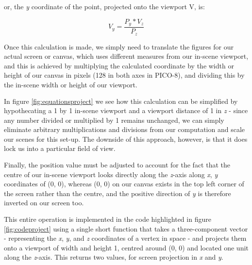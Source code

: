 \documentclass[11pt]{article}
\begin{document}
or, the \textit{y} coordinate of the point, projected onto the viewport V, is:

\begin{equation}
   V_y = \frac{P_y * V_z} {P_z}
\end{equation}

Once this calculation is made, we simply need to translate the figures for our actual screen or canvas, which uses different
measures from our in-scene viewport, and this is achieved by multiplying the calculated coordinate by the width or height of
our canvas in pixels (128 in both axes in PICO-8), and dividing this by the in-scene width or height of our viewport.

In figure \ref{fig:equationsproject} we see how this calculation can be simplified by hypothecating a 1 by 1 in-scene viewport and
a viewport distance of 1 in \textit{z} - since any number divided or multiplied by 1 remains unchanged, we can simply eliminate
arbitrary multiplications and divisions from our computation and scale our scenes for this set-up. The downside of this approach,
however, is that it does lock us into a particular field of view.

Finally, the position value must be adjusted to account for the fact that the centre of our in-scene viewport looks directly
along the \textit{z}-axis along \textit{x}, \textit{y} coordinates of (0, 0), whereas (0, 0) on our canvas exists
in the top left corner of the screen rather than the centre, and the positive direction of \textit{y} is therefore
inverted on our screen too.

This entire operation is implemented in the code highlighted in figure \ref{fig:codeproject} using a single short function
that takes a three-component vector - representing the \textit{x}, \textit{y}, and \textit{z} coordinates of a
vertex in space - and projects them onto a viewport of width and height 1, centred around (0, 0) and located
one unit along the \textit{z}-axis. This returns two values, for screen projection in \textit{x} and \textit{y}.
\end{document}
